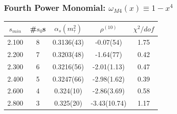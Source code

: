 \documentclass{beamer}
\begin{document}
\begin{frame}
  \frametitle{Fourth Power Monomial: \(\omega_{M4}(x) \equiv 1-x^4\)}
  \centering
  \begin{tabular}{ccccc}
    \toprule
    \(s_{min}\) & \#\(s_0\)s & \(\alpha_s(m_\tau^2)\) & \(\rho^{(10)}\) & \(\chi^2/dof\)  \\
    \midrule
    2.100 & 8  & 0.3136(43) & -0.07(54) & 1.75 \\
    \rowcolor{primary}
    2.200 & 7  & 0.3203(48) & -1.64(77) & 0.42 \\
    2.300 & 6  & 0.3216(56) & -2.01(1.13) & 0.47 \\
    2.400 & 5  & 0.3247(66) & -2.98(1.62) & 0.39 \\
    2.600 & 4  & 0.324(10) & -2.86(3.69) & 0.58 \\
    2.800 & 3  & 0.325(20) & -3.43(10.74) & 1.17 \\
    \bottomrule
  \end{tabular}
\end{frame}
\end{document}

